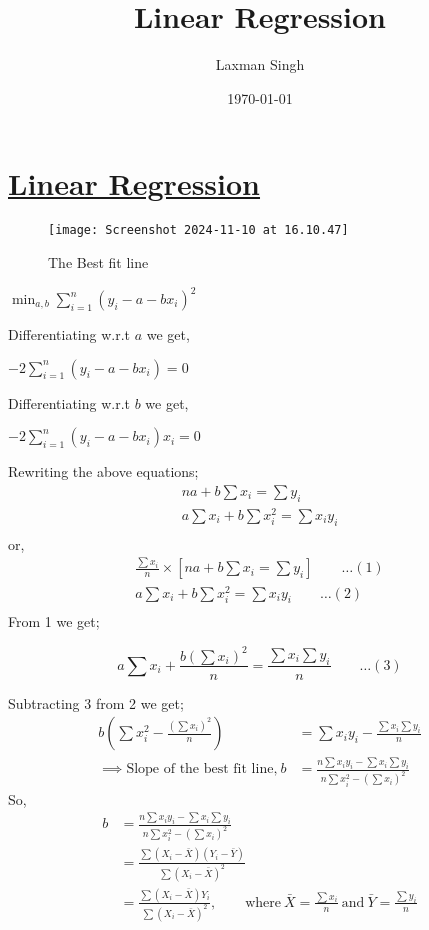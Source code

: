 \documentclass[12pt,a4paper]{article}
\author{Laxman Singh}
\date{\today}
\title{Linear Regression}
\begin{document}
    \section*{\underline{Linear Regression}}
    \begin{figure}[h]
        \centering
        \texttt{[image: Screenshot 2024-11-10 at 16.10.47]}
        \caption{The Best fit line}
        \label{Label}
    \end{figure}
   
   \(\min_{a,b}\sum_{i=1}^{n}(y_{i}-a-bx_{i})^2\)  

   Differentiating w.r.t \(a\) we get,
   
   \(-2\sum_{i=1}^{n}(y_i-a-bx_i)=0\)

   Differentiating w.r.t \(b\) we get,
   
   \(-2\sum_{i=1}^{n}(y_i-a-bx_i)x_{i}=0\)

   Rewriting the above equations;
   \begin{equation*}
    \begin{split}
        na + b\sum x_{i}= \sum y_{i}\\
        a\sum x_{i} +b \sum x_{i}^2 = \sum x_{i}y_{i}\\ 
    \end{split}
    \end{equation*}
    or,
    \begin{equation*}
        \begin{split}
            \frac{\sum x_{i}}{n}\times [na + b\sum x_{i}= \sum y_{i}] \qquad \ldots (1)\\
            a\sum x_{i} +b \sum x_{i}^2 = \sum x_{i}y_{i} \qquad \ldots (2)\\ 
        \end{split}
        \end{equation*}  
    From 1 we get;

    \begin{equation*}
       a\sum x_{i}+ \frac{b\left( \sum x_{i} \right)^2}{n} = \frac{\sum x_{i}\sum y_{i}}{n} \qquad \ldots (3) 
    \end{equation*} 
    
    Subtracting 3 from 2 we get;
    \begin{align*}
        b \left(\sum x_{i}^2 - \frac{(\sum x_{i})^2}{n} \right)&= \sum x_{i}y_{i} - \frac{\sum x_{i}\sum y_{i}}{n}\\
        \implies \text{Slope of the best fit line,} \ b&= \frac{n\sum x_{i}y_{i} - \sum x_{i}\sum y_{i}}{n\sum x_{i}^2 - \left( \sum x_{i} \right)^2} 
    \end{align*}    
 So,
  \begin{align*}
    b&= \frac{n\sum x_{i}y_{i} - \sum x_{i}\sum y_{i}}{n\sum x_{i}^2 - \left( \sum x_{i} \right)^2}\\
    &= \frac{\sum(X_{i}-\bar{X})(Y_{i}-\bar{Y})}{\sum (X_{i}-\bar{X})^2}\\
    &= \frac{\sum (X_{i}-\bar{X})Y_{i}}{\sum (X_{i}-\bar{X})^2}, \qquad \text{where} \ \bar{X}= \frac{\sum x_{i}}{n} \ \text{and} \ \bar{Y}= \frac{\sum y_{i}}{n} \\
 \end{align*}
\end{document}

